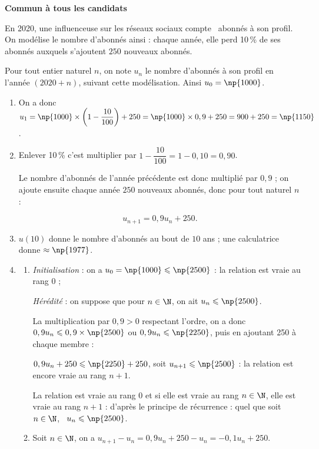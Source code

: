 \textbf{Commun à tous les candidats}

\medskip

En 2020, une influenceuse sur les réseaux sociaux compte ~abonnés à son profil. On modélise le nombre d'abonnés ainsi : chaque année, elle perd 10\,\% de ses abonnés auxquels s'ajoutent $250$ nouveaux abonnés.

Pour tout entier naturel $n$, on note $u_n$ le nombre d'abonnés à son profil en l'année $(2020 + n)$, suivant cette modélisation. Ainsi $u_0 = \np{1000}$.

\medskip

\begin{enumerate}
\item 
On a donc $u_1 = \np{1000} \times \left(1 - \dfrac{10}{100}\right) + 250 = \np{1000} \times 0,9 + 250 = 900 + 250 = \np{1150}$.
\item 

Enlever 10\,\% c'est multiplier par $1 - \dfrac{10}{100} = 1 - 0,10 = 0,90$.

Le nombre d'abonnés de l'année précédente est donc multiplié par $0,9$ ; on ajoute ensuite chaque année $250$ nouveaux abonnés, donc pour tout naturel $n$ :

\[u_{n+1} = 0,9u_n + 250.\]

\item 










$u(10)$ donne le nombre d'abonnés au bout de $10$ ans ; une calculatrice donne $\approx \np{1977}$.
\item 
	\begin{enumerate}
		\item 

\emph{Initialisation } : on a $u_0 = \np{1000} \leqslant  \np{2500}$ : la relation est vraie au rang $0$ ;

\emph{Hérédité} : on suppose que pour $n \in \N$, on ait $u_n \leqslant \np{2500}$.

La multiplication par $0,9  > 0$ respectant l'ordre, on a donc $0,9u_n \leqslant 0,9 \times \np{2500}$ ou $0,9u_n \leqslant \np{2250}$, puis en ajoutant 250 à chaque membre :

$0,9u_n + 250 \leqslant \np{2250} + 250$, soit $u_{n+1} \leqslant \np{2500}$ : la relation est encore vraie au rang $n+1$.

La relation est vraie au rang $0$ et si elle est vraie au rang $n \in \N$, elle est vraie au rang $n + 1$ : d'après le principe de récurrence : quel que soit $n \in \N$, \, $u_n \leqslant \np{2500}$.
		\item 
Soit $n \in \N$, on a $u_{n+1} - u_n = 0,9u_n + 250 - u_n = -0,1u_n + 250$.


\end{enumerate}
\end{enumerate}
